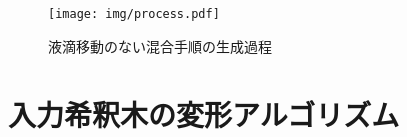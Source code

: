 \begin{figure}[tbp]
 \centering\texttt{[image: img/process.pdf]}
 \caption{液滴移動のない混合手順の生成過程}\label{fig:process}
\end{figure}

\section{入力希釈木の変形アルゴリズム}
\section{}
